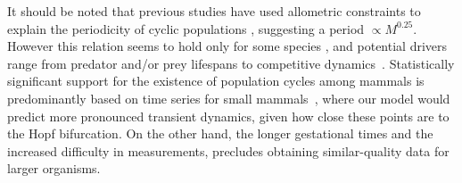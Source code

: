 \documentclass{pnastwo}
\begin{document}
\begin{article}
It should be noted that previous studies have used allometric constraints to explain the periodicity of cyclic populations
\cite{CalderIII:1983jd,Peterson:1984hj,Krukonis:1991fk}, suggesting a period
$\propto M^{0.25}$.  However this relation seems to hold only for some
species \cite{Hendriks:2012fc}, and potential drivers range from predator
and/or prey lifespans to competitive
dynamics~\cite{Kendall:1999iy,Hogstedt:2005cr}.
Statistically significant support for the existence of population cycles
among mammals is predominantly based on time series for small
mammals~\cite{Kendall:1998hl}, where our model would predict more pronounced transient dynamics, given how close these points are to
the Hopf bifurcation.  On the other hand, the longer gestational times and
the increased difficulty in measurements, precludes obtaining similar-quality
data for larger organisms.
\vspace{6mm}


\end{article}
\end{document}

